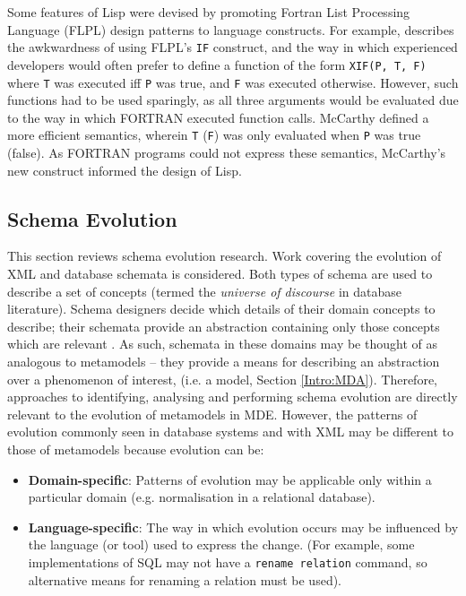 Some features of Lisp were devised by promoting Fortran List Processing Language (FLPL) design patterns to language constructs. For example, \cite{mcarthy78lisp} describes the awkwardness of using FLPL's \verb|IF| construct, and the way in which experienced developers would often prefer to define a function of the form \verb|XIF(P, T, F)| where \verb|T| was executed iff \verb|P| was true, and \verb|F| was executed otherwise. However, such functions had to be used sparingly, as all three arguments would be evaluated due to the way in which FORTRAN executed function calls. McCarthy \cite{mcarthy78lisp} defined a more efficient semantics, wherein \verb|T| (\verb|F|) was only evaluated when  \verb|P| was true (false). As FORTRAN programs could not express these semantics, McCarthy's new construct informed the design of Lisp.


\subsection{Schema Evolution}
\label{LitReview:Schemas}
This section reviews schema evolution research. Work covering the evolution of XML and database schemata is considered. Both types of schema are used to describe a set of concepts (termed the \textit{universe of discourse} in database literature). Schema designers decide which details of their domain concepts to describe; their schemata provide an abstraction containing only those concepts which are relevant \cite[pg30]{elmasri06database}. As such, schemata in these domains may be thought of as analogous to metamodels -- they provide a means for describing an abstraction over a phenomenon of interest, (i.e. a model, Section \ref{Intro:MDA}). Therefore, approaches to identifying, analysing and performing schema evolution are directly relevant to the evolution of metamodels in MDE. However, the patterns of evolution commonly seen in database systems and with XML may be different to those of metamodels because evolution can be:

\begin{itemize}
 \item \textbf{Domain-specific}: Patterns of evolution may be applicable only within a particular domain (e.g. normalisation in a relational database).
 \item \textbf{Language-specific}: The way in which evolution occurs may be influenced by the language (or tool) used to express the change. (For example, some implementations of SQL may not have a \texttt{rename relation} command, so alternative means for renaming a relation must be used).
\end{itemize}

